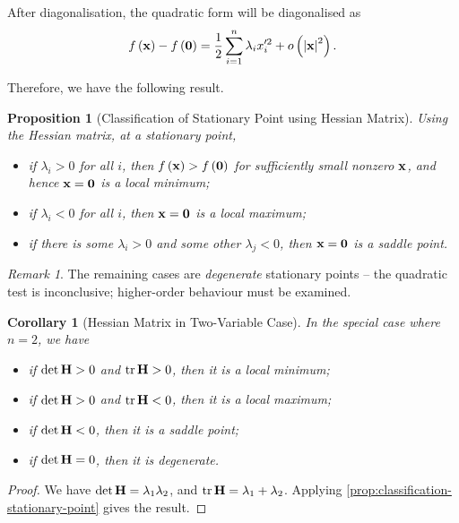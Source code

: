 \documentclass[11pt]{article}
\numberwithin{equation}{section}
\newtheorem{proposition}[theorem]{Proposition}
\newtheorem{corollary}[theorem]{Corollary}
\theoremstyle{definition}
\theoremstyle{remark}
\newtheorem{remark}[theorem]{Remark}
\newcommand{\pqty}[1]{\left(#1\right)}
\newcommand{\abs}[1]{\left|#1\right|}
\DeclareMathOperator{\tr}{tr}
\begin{document}
After diagonalisation, the quadratic form will be diagonalised as
\[
    f\pqty{\vb{x}} - f\pqty{\vb{0}} = \frac{1}{2} \sum_{i = 1}^{n} \lambda_i x_i'^2 + o\pqty{\abs{\vb{x}}^2}.
\]

Therefore, we have the following result.

\begin{proposition}[Classification of Stationary Point using Hessian Matrix]\label{variation-unit-0003}
    \label{prop:classification-stationary-point}%
    Using the Hessian matrix, at a stationary point,
    \begin{itemize}
        \item if \(\lambda_i > 0\) for all \(i\), then \(f\pqty{\vb{x}} > f\pqty{\vb{0}}\) for sufficiently small nonzero \(\vb{x}\), and hence \(\vb{x} = \vb{0}\) is a \emph{local minimum};
        \item if \(\lambda_i < 0\) for all \(i\), then \(\vb{x} = \vb{0}\) is a \emph{local maximum};
        \item if there is some \(\lambda_i > 0\) and some other \(\lambda_j < 0\), then \(\vb{x} = \vb{0}\) is a \emph{saddle point}.
    \end{itemize}
\end{proposition}

\begin{remark}\label{variation-unit-0004}
    The remaining cases are \emph{degenerate} stationary points -- the quadratic test is inconclusive; higher-order behaviour must be examined.
\end{remark}

\begin{corollary}[Hessian Matrix in Two-Variable Case]\label{variation-unit-0005}
    \label{cor:hessian-2-d}%
    In the special case where \(n = 2\), we have
    \begin{itemize}
        \item if \(\det \vb{H} > 0\) and \(\tr \vb{H} > 0\), then it is a local minimum;
        \item if \(\det \vb{H} > 0\) and \(\tr \vb{H} < 0\), then it is a local maximum;
        \item if \(\det \vb{H} < 0\), then it is a saddle point;
        \item if \(\det \vb{H} = 0\), then it is degenerate.
    \end{itemize}
\end{corollary}

\begin{proof}
    We have \(\det \vb{H} = \lambda_1 \lambda_2\), and \(\tr \vb{H} = \lambda_1 + \lambda_2\). Applying \autoref{prop:classification-stationary-point} gives the result.
\end{proof}
\end{document}
